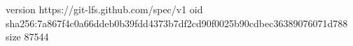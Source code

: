 version https://git-lfs.github.com/spec/v1
oid sha256:7a867f4c0a66ddeb0b39fdd4373b7df2cd90f0025b90cdbec36389076071d788
size 87544

